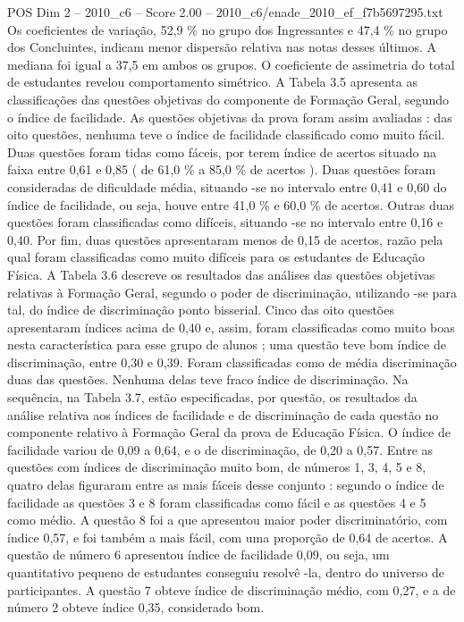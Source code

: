 \begin{textsample}{POS Dim 2 – 2010\_c6 – Score 2.00 – 2010\_c6/enade\_2010\_ef\_f7b5697295.txt}
Os coeficientes de variação, 52,9 \% no grupo dos Ingressantes e 47,4 \% no grupo dos Concluintes, indicam menor dispersão relativa nas notas desses últimos.
A mediana foi igual a 37,5 em ambos os grupos.
O coeficiente de assimetria do total de estudantes revelou comportamento simétrico.
A Tabela 3.5 apresenta as classificações das questões objetivas do componente de Formação Geral, segundo o índice de facilidade.
As questões objetivas da prova foram assim avaliadas : das oito questões, nenhuma teve o índice de facilidade classificado como muito fácil.
Duas questões foram tidas como fáceis, por terem índice de acertos situado na faixa entre 0,61 e 0,85 ( de 61,0 \% a 85,0 \% de acertos ).
Duas questões foram consideradas de dificuldade média, situando -se no intervalo entre 0,41 e 0,60 do índice de facilidade, ou seja, houve entre 41,0 \% e 60,0 \% de acertos.
Outras duas questões foram classificadas como difíceis, situando -se no intervalo entre 0,16 e 0,40.
Por fim, duas questões apresentaram menos de 0,15 de acertos, razão pela qual foram classificadas como muito difíceis para os estudantes de Educação Física.
A Tabela 3.6 descreve os resultados das análises das questões objetivas relativas à Formação Geral, segundo o poder de discriminação, utilizando -se para tal, do índice de discriminação ponto bisserial.
Cinco das oito questões apresentaram índices acima de 0,40 e, assim, foram classificadas como muito boas nesta característica para esse grupo de alunos ; uma questão teve bom índice de discriminação, entre 0,30 e 0,39.
Foram classificadas como de média discriminação duas das questões.
Nenhuma delas teve fraco índice de discriminação.
Na sequência, na Tabela 3.7, estão especificadas, por questão, os resultados da análise relativa aos índices de facilidade e de discriminação de cada questão no componente relativo à Formação Geral da prova de Educação Física.
O índice de facilidade variou de 0,09 a 0,64, e o de discriminação, de 0,20 a 0,57.
Entre as questões com índices de discriminação muito bom, de números 1, 3, 4, 5 e 8, quatro delas figuraram entre as mais fáceis desse conjunto : segundo o índice de facilidade as questões 3 e 8 foram classificadas como fácil e as questões 4 e 5 como médio.
A questão 8 foi a que apresentou maior poder discriminatório, com índice 0,57, e foi também a mais fácil, com uma proporção de 0,64 de acertos.
A questão de número 6 apresentou índice de facilidade 0,09, ou seja, um quantitativo pequeno de estudantes conseguiu resolvê -la, dentro do universo de participantes.
A questão 7 obteve índice de discriminação médio, com 0,27, e a de número 2 obteve índice 0,35, considerado bom.

\end{textsample}
